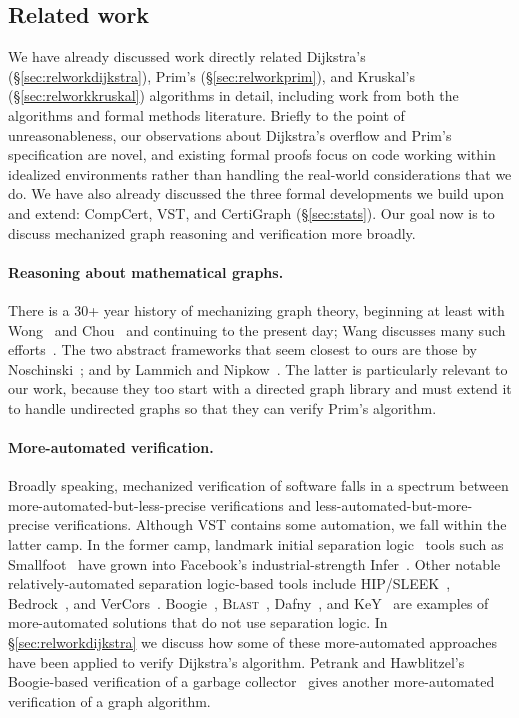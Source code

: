 \subsection{Related work}

We have already discussed work directly related Dijkstra's (\S\ref{sec:relworkdijkstra}), Prim's (\S\ref{sec:relworkprim}), and Kruskal's (\S\ref{sec:relworkkruskal}) algorithms in detail, including work from both the algorithms and formal methods literature.  Briefly to the point of unreasonableness, our observations about Dijkstra's overflow and Prim's specification are novel, and existing formal proofs focus on code working within idealized environments rather than handling the real-world considerations that we do.  We have also already discussed the three formal developments we
build upon and extend: CompCert, VST, and CertiGraph (\S\ref{sec:stats}).  Our goal now is to discuss mechanized graph reasoning and verification more broadly.

\paragraph{Reasoning about mathematical graphs.}
There is a 30+ year history of mechanizing graph theory, beginning at least with Wong~\cite{wong1991} and Chou~\cite{chou1994formal} and continuing to the present day; Wang discusses many such efforts~\cite[\S3.3]{shengyi:thesis}.  The two abstract frameworks that seem closest to ours are those by Noschinski~\cite{Noschinski2015}; and by Lammich and Nipkow~\cite{DBLP:journals/afp/LammichN19}.  The latter is particularly relevant to our work, because they too start with a directed graph library and must extend it to handle undirected graphs so that they can verify Prim's algorithm.

\paragraph{More-automated verification.}
Broadly speaking, mechanized verification of software falls in a spectrum between more-automated-but-less-precise verifications and less-automated-but-more-precise verifications.  Although VST contains some automation, we fall within the latter camp.  In the former camp, landmark initial separation logic~\cite{o2001local} tools such as Smallfoot~\cite{berdine:smallfoot} have grown into Facebook's industrial-strength Infer~\cite{calcagno2015moving}.  Other notable relatively-automated separation logic-based tools include HIP/SLEEK~\cite{chin:hipsleek}, Bedrock~\cite{chlipala:bedrock}, and VerCors~\cite{DBLP:conf/fm/BlomH14}.  Boogie~\cite{barnett2005boogie}, \textsc{Blast}~\cite{DBLP:journals/sttt/BeyerHJM07}, Dafny~\cite{leino10}, and KeY~\cite{DBLP:series/lncs/10001} are examples of more-automated solutions that do not use separation logic.  In \S\ref{sec:relworkdijkstra} we discuss how some of these more-automated approaches have been applied to verify Dijkstra's algorithm. Petrank and Hawblitzel's Boogie-based verification of a garbage collector~\cite{gcexample2} gives another more-automated verification of a graph algorithm.

